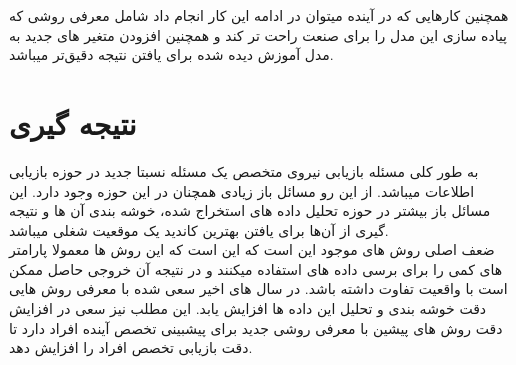 همچنین کارهایی که در آینده میتوان در ادامه این کار انجام داد شامل معرفی روشی که پیاده سازی این مدل را برای صنعت راحت تر کند و همچنین افزودن متغیر های جدید به مدل آموزش دیده شده برای یافتن نتیجه دقیق‌تر میباشد.



\section*{نتیجه گیری}
به طور کلی مسئله بازیابی نیروی متخصص یک مسئله نسبتا جدید در حوزه بازیابی اطلاعات میباشد. از این رو مسائل باز زیادی همچنان در این حوزه وجود دارد. این مسائل باز بیشتر در حوزه تحلیل داده های استخراج شده، خوشه بندی آن ها و نتیجه گیری از آن‌ها برای یافتن بهترین کاندید یک موقعیت شغلی میباشد.
\\
ضعف اصلی روش های موجود این است که این است که این روش ها معمولا پارامتر های کمی را برای برسی داده های استفاده میکنند و در نتیجه آن خروجی حاصل ممکن است با واقعیت تفاوت داشته باشد.
در سال های اخیر سعی شده با معرفی روش هایی دقت خوشه بندی و تحلیل این داده ها افزایش یابد.
این مطلب نیز سعی در افزایش دقت روش های پیشین با معرفی روشی جدید برای پیشبینی تخصص آینده افراد دارد تا دقت بازیابی تخصص افراد را افزایش دهد.